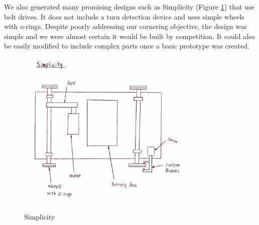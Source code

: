 \documentclass[class=../report, crop=false]{standalone}
\begin{document}
\clearpage

We also generated many promising designs such as Simplicity (Figure \ref{fig:simplicity}) that use belt drives.
It does not include a turn detection device and uses simple wheels with o-rings.
Despite poorly addressing our cornering objective, the design was simple and we were almost certain it would be built by competition.
It could also be easily modified to include complex parts once a basic prototype was created.

\begin{figure}[H]
	\centering
	\includegraphics[width=0.8\textwidth]{../res/img/simplicity}
	\caption{Simplicity}
	\label{fig:simplicity}
\end{figure}
\end{document}
